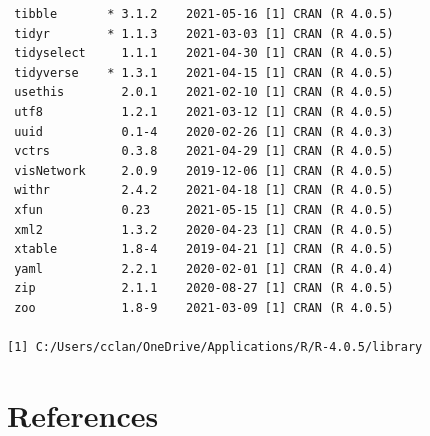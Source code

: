 \documentclass [11pt, proquest] {uwthesis}[2015/03/03]
\begin{document}
\begin{verbatim}
 tibble       * 3.1.2    2021-05-16 [1] CRAN (R 4.0.5)                       
 tidyr        * 1.1.3    2021-03-03 [1] CRAN (R 4.0.5)                       
 tidyselect     1.1.1    2021-04-30 [1] CRAN (R 4.0.5)                       
 tidyverse    * 1.3.1    2021-04-15 [1] CRAN (R 4.0.5)                       
 usethis        2.0.1    2021-02-10 [1] CRAN (R 4.0.5)                       
 utf8           1.2.1    2021-03-12 [1] CRAN (R 4.0.5)                       
 uuid           0.1-4    2020-02-26 [1] CRAN (R 4.0.3)                       
 vctrs          0.3.8    2021-04-29 [1] CRAN (R 4.0.5)                       
 visNetwork     2.0.9    2019-12-06 [1] CRAN (R 4.0.5)                       
 withr          2.4.2    2021-04-18 [1] CRAN (R 4.0.5)                       
 xfun           0.23     2021-05-15 [1] CRAN (R 4.0.5)                       
 xml2           1.3.2    2020-04-23 [1] CRAN (R 4.0.5)                       
 xtable         1.8-4    2019-04-21 [1] CRAN (R 4.0.5)                       
 yaml           2.2.1    2020-02-01 [1] CRAN (R 4.0.4)                       
 zip            2.1.1    2020-08-27 [1] CRAN (R 4.0.5)                       
 zoo            1.8-9    2021-03-09 [1] CRAN (R 4.0.5)                       

[1] C:/Users/cclan/OneDrive/Applications/R/R-4.0.5/library
\end{verbatim}
\backmatter

\hypertarget{references}{%
\chapter*{References}\label{references}}

\noindent

\setlength{\parindent}{-0.20in}
\setlength{\leftskip}{0.20in}
\setlength{\parskip}{8pt}
\end{document}
